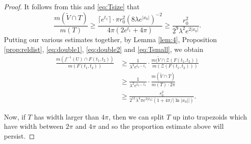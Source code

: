 \documentclass[10pt,a4paper]{amsart}
\begin{document}
\begin{proof}
It follows from this and \eqref{eq:Tsize} that 
\begin{equation}
    \label{eq:Tsmall}
\frac{ m(\widetilde{V}\cap T)}{m(T)} \geq \frac{\lceil e^{t_1} \rceil \cdot \pi r_0^2(8\lambda e^{|x_0|})^{-2} }{ 4\pi ( 2e^{t_1} + 4\pi) } \geq \frac{r_0^2}{2^9 \lambda^2 e^{2|x_0|} }.   
\end{equation}
Putting our various estimates together, by Lemma \ref{lem:4}, Proposition \ref{prop:reldist}, \eqref{eq:double1}, \eqref{eq:double2} and \eqref{eq:Tsmall}, we obtain
\begin{align*}
\frac{ m(f^{-1}(U) \cap F(t_1,t_2) ) }{m(F(t_1,t_2))} &\geq \frac{1}{\lambda^2 e^{t_2-t_1}} \cdot \frac{ m(\widetilde{V} \cap \mathcal{Z}(F(t_1,t_2)) }{m(\mathcal{Z}(F(t_1,t_2)))} \\
&\geq \frac{1}{\lambda^2 e^{t_2-t_1}} \cdot \frac {m(\widetilde{V} \cap T)}{ m(T) \cdot 2\pi} \\
&\geq \frac{ r_0^2}{ 2^{11}\lambda^4 \pi e^{2|x_0|}(1 + 4\pi / |\ln |x_0||) }.
\end{align*}

Now, if $T$ has width larger than $4\pi$, then we can split $T$ up into trapezoids which have width between $2\pi$ and $4\pi$ and so the proportion estimate above will persist.
\end{proof}
\end{document}
